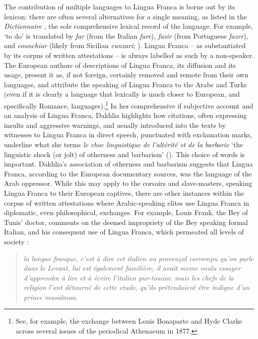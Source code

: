 \documentclass[output=paper]{langsci/langscibook}
\begin{document}
	The contribution of multiple languages to Lingua Franca is borne out by its lexicon: there are often several alternatives for a single meaning, as listed in the \textit{Dictionnaire} \citep{Anonymous1830}, the sole comprehensive lexical record of the language. For example, ‘to do’ is translated by \textit{far} (from the Italian \textit{fare}), \textit{fazir} (from Portuguese \textit{fazer}), and \textit{counchiar} (likely from Sicilian \textit{cunzari}; \citealt[316]{Cifoletti2004}). Lingua Franca – as substantiated by its corpus of written attestations – is always labelled as such by a non-speaker. The European authors of descriptions of Lingua Franca, its diffusion and its usage, present it as, if not foreign, certainly removed and remote from their own languages, and attribute the speaking of Lingua Franca to the Arabs and Turks (even if it is clearly a language that lexically is much closer to European, and specifically Romance, languages).\footnote{See, for example, the exchange between Louis Bonaparte and Hyde Clarke across several issues of the periodical Athenaeum in 1877.} In her comprehensive if subjective account and an  analysis of Lingua Franca, Dakhlia highlights how citations, often expressing insults and aggressive warnings, and usually introduced into the texts by witnesses to Lingua Franca in direct speech, punctuated with exclamation marks, underline what she terms \textit{le choc linguistique de l’altérité et de la barbarie} ‘the linguistic shock (or jolt) of otherness and barbarism’ (\citealt[351]{Dakhlia2008}). This choice of words is important. Dakhlia’s association of otherness and barbarism suggests that Lingua Franca, according to the European documentary sources, was the language of the Arab oppressor. While this may apply to the corsairs and slave-masters, speaking Lingua Franca to their European captives, there are other instances within the corpus of written attestations where Arabic-speaking elites use Lingua Franca in diplomatic, even philosophical, exchanges. For example, Louis Frank, the Bey of Tunis’ doctor, comments on the deemed impropriety of the Bey speaking formal Italian, and his consequent use of Lingua Franca, which permeated all levels of society \citep[70]{Frank1850}:
	
	\begin{quote}
		\textit{la langue franque, c’est à dire cet italien ou provençal corrompu qu’on parle dans le Levant, lui est également familière; il avait meme voulu essayer d’ap\-prendre à lire et à écrire l’italien pur-toscan: mais les chefs de la religion l’ont détourné de cette etude, qu’ils prétendaient être indigne d’un prince musulman.}
	\end{quote}
	
\end{document}
